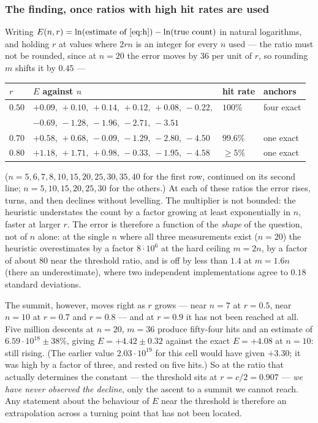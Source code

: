 \documentclass[11pt,a4paper]{article}
\begin{document}
\subsubsection*{The finding, once ratios with high hit rates are used}
Writing $E(n,r)=\ln(\text{estimate of \eqref{eq:h}})-\ln(\text{true count})$ in natural
logarithms, and holding $r$ at values where $2rn$ is an integer for every $n$ used --- the ratio
must not be rounded, since at $n=20$ the error moves by $36$ per unit of $r$, so rounding $m$
shifts it by $0.45$ ---
\begin{center}
\begin{tabular}{llll}
\toprule
$r$ & $E$ against $n$ & hit rate & anchors\\
\midrule
$0.50$ & $+0.09,\,+0.10,\,+0.14,\,+0.12,\,+0.08,\,-0.22,$ & $100\%$ & four exact\\
       & $-0.69,\,-1.28,\,-1.96,\,-2.71,\,-3.51$ & & \\
$0.70$ & $+0.58,\,+0.68,\,-0.09,\,-1.29,\,-2.80,\,-4.50$ & $99.6\%$ & one exact\\
$0.80$ & $+1.18,\,+1.71,\,+0.98,\,-0.33,\,-1.95,\,-4.58$ & $\ge5\%$ & one exact\\
\bottomrule
\end{tabular}
\end{center}
($n=5,6,7,8,10,15,20,25,30,35,40$ for the first row, continued on its second line; $n=5,10,15,20,25,30$ for the others.)  At each of
these ratios the error rises, turns, and then declines without levelling.  The multiplier is not
bounded: the heuristic understates the count by a factor growing at least exponentially in $n$,
faster at larger $r$.  The error is therefore a function of the \emph{shape} of the question, not of $n$ alone: at the single
$n$ where all three measurements exist ($n=20$) the heuristic overestimates by a factor $8\cdot10^{6}$ at the hard ceiling
$m=2n$, by a factor of about $80$ near the threshold ratio, and is off by less than $1.4$ at $m=1.6n$ (there an
underestimate), where two independent implementations agree to $0.18$ standard deviations.

The summit, however, moves right as $r$ grows --- near $n=7$ at $r=0.5$, near $n=10$ at $r=0.7$
and $r=0.8$ --- and at $r=0.9$ it has not been reached at all.  Five million descents at
$n=20$, $m=36$ produce fifty-four hits and an estimate of $6.59\cdot10^{18}\pm38\%$, giving
$E=+4.42\pm0.32$ against the exact $E=+4.08$ at $n=10$: still rising.  (The earlier value
$2.03\cdot10^{19}$ for this cell would have given $+3.30$; it was high by a factor of three, and
rested on five hits.)  So at the ratio that actually determines the constant --- the threshold
sits at $r=c/2=0.907$ --- \emph{we have never observed the decline}, only the ascent to a summit
we cannot reach.  Any statement about the behaviour of $E$ near the threshold is therefore an
extrapolation across a turning point that has not been located.
\end{document}
